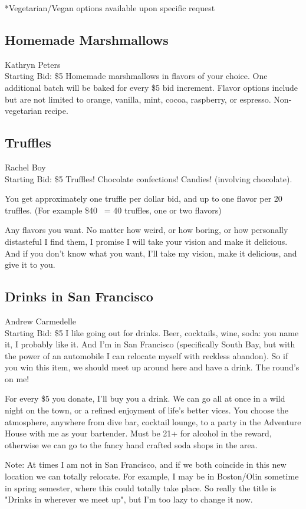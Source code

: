 \documentclass[11pt]{article}
\begin{document}
*Vegetarian/Vegan options available upon specific request
\subsection{Homemade Marshmallows}
Kathryn Peters
\\
Starting Bid: \$5
\newline
Homemade marshmallows in flavors of your choice. One additional batch will be baked for every \$5 bid increment. Flavor options include but are not limited to orange, vanilla, mint, cocoa, raspberry, or espresso. Non-vegetarian recipe.
\subsection{Truffles}
Rachel Boy
\\
Starting Bid: \$5
\newline
Truffles! Chocolate confections! Candies! (involving chocolate). 

You get approximately one truffle per dollar bid, and up to one flavor per 20 truffles. (For example \$40 ~= 40 truffles, one or two flavors) 

Any flavors you want. No matter how weird, or how boring, or how personally distasteful I find them, I promise I will take your vision and make it delicious. And if you don't know what you want, I'll take my vision, make it delicious, and give it to you.
\subsection{Drinks in San Francisco}
Andrew Carmedelle
\\
Starting Bid: \$5
\newline
I like going out for drinks. Beer, cocktails, wine, soda: you name it, I probably like it. And I'm in San Francisco (specifically South Bay, but with the power of an automobile I can relocate myself with reckless abandon). So if you win this item, we should meet up around here and have a drink. The round's on me! 

For every \$5 you donate, I'll buy you a drink. We can go all at once in a wild night on the town, or a refined enjoyment of life's better vices. You choose the atmosphere, anywhere from dive bar, cocktail lounge, to a party in the Adventure House with me as your bartender. Must be 21+ for alcohol in the reward, otherwise we can go to the fancy hand crafted soda shops in the area.

Note: At times I am not in San Francisco, and if we both coincide in this new location we can totally relocate. For example, I may be in Boston/Olin sometime in spring semester, where this could totally take place. So really the title is "Drinks in wherever we meet up", but I'm too lazy to change it now.
\end{document}
